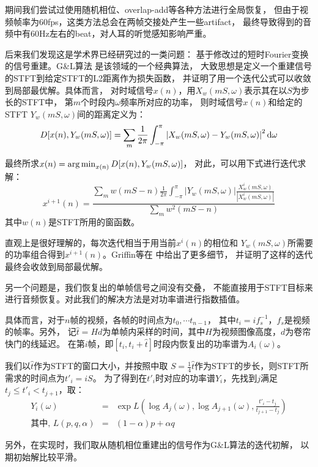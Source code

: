 期间我们尝试过使用随机相位、overlap-add等各种方法进行全局恢复，
但由于视频帧率为60fps，这类方法总会在两帧交接处产生一些artifact，
最终导致得到的音频中有60Hz左右的beat，对人耳的听觉感知影响严重。

后来我们发现这是学术界已经研究过的一类问题：
基于修改过的短时Fourier变换的信号重建。G\&L算法\cite{griffin1984signal}
是该领域的一个经典算法，
大致思想是定义一个重建信号的STFT到给定STFT的L2距离作为损失函数，
并证明了用一个迭代公式可以收敛到局部最优解。具体而言，
对时域信号$x(n)$，用$X_w(mS, \omega)$表示其在以$S$为步长的STFT中，
第$m$个时段内$\omega$频率所对应的功率，
则时域信号$x(n)$和给定的STFT $Y_w(mS, \omega)$间的距离定义为：
\begin{equation}
    D[x(n), Y_w(mS, \omega)] = \sum_{m}\frac{1}{2\pi}
    \int_{-\pi}^{\pi}\left|X_w(mS,\omega)-Y_w(mS,\omega)\right|^2
    \mathrm{d}{\omega}
\end{equation}

最终所求$x(n)=\operatorname*{arg\,min}_{x(n)}D[x(n), Y_w(mS, \omega)]$，
对此，可以用下式进行迭代求解：
\begin{equation}
    x^{i+1}(n) = \frac{\sum_{m}w(mS-n)\frac{1}{2\pi}
        \int_{-\pi}^{\pi}|Y_w(mS,\omega)|\frac{
        X_w^i(mS,\omega)}{|X_w^i(mS,\omega)|}}{
        \sum_m w^2(mS-n)}
    \label{eqn:gliter}
\end{equation}
其中$w(n)$是STFT所用的窗函数。

直观上是很好理解的，每次迭代相当于用当前$x^i(n)$的相位和
$Y_w(mS, \omega)$所需要的功率组合得到$x^{i+1}(n)$。Griffin等在
\cite{griffin1984signal}中给出了更多细节，
并证明了这样的迭代最终会收敛到局部最优解。

另一个问题是，我们恢复出的单帧信号之间没有交叠，
不能直接用于STFT目标来进行音频恢复。对此我们的解决方法是对功率谱进行指数插值。

具体而言，对于$n$帧的视频，各帧的时间点为$t_0,\cdots t_{n-1}$，
其中$t_i=if_s^{-1}$，$f_s$是视频的帧率。另外，
记$\hat{t}=Hd$为单帧内采样的时间，其中$H$为视频图像高度，$d$为卷帘快门的线延迟。
在第$i$帧，即$[t_i, t_i+\hat{t}]$时段内恢复出的功率谱为$A_i(\omega)$。

我们以$\hat{t}$作为STFT的窗口大小，并按照\cite{griffin1984signal}中取
$S=\frac{1}{4}\hat{t}$作为STFT的步长，则STFT所需求的时间点为$t'_i=iS$。
为了得到在$t'_i$时对应的功率谱$Y_i$，先找到$j$满足$t_j\le t'_i < t_{j+1}$，取：
\begin{eqnarray}
    Y_i(\omega) &=& \exp{L(\log{A_j(\omega)}, \log{A_{j+1}(\omega)},
    \frac{t'_i-t_j}{t_{j+1}-t_j})} \\
    \text{其中, } L(p, q, \alpha) &=& (1-\alpha)p+\alpha q \nonumber
\end{eqnarray}

另外，在实现时，我们取从随机相位重建出的信号作为G\&L算法的迭代初解，
以期初始解比较平滑。



